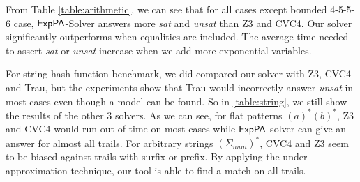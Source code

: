 
From Table \ref{table:arithmetic}, we can see that for all cases except bounded 4-5-5-6 case, ${\sf ExpPA}$-Solver answers more \textit{sat} and \textit{unsat} than Z3 and CVC4. Our solver significantly outperforms when equalities are included. The average time needed to assert \textit{sat} or \textit{unsat} increase when we add more exponential variables.


For string hash function benchmark, we did compared our solver with Z3, CVC4 and Trau, but the experiments show that Trau would incorrectly answer \textit{unsat} in most cases even though a model can be found. So in \ref{table:string}, we still show the results of the other 3 solvers. As we can see, for flat patterns $(a)^*(b)^*$, Z3 and CVC4 would run out of time on most cases while ${\sf ExpPA}$-solver can give an answer for almost all trails. For arbitrary strings $(\Sigma_{num})^*$, CVC4 and Z3 seem to be biased against trails with surfix or prefix. By applying the under-approximation technique, our tool is able to find a match on all trails. 



